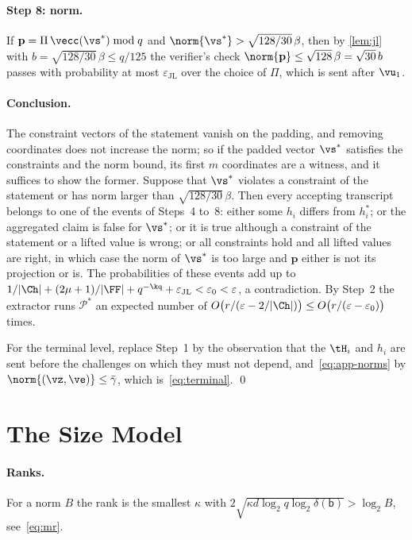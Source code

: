 \paragraph{Step 8: norm.}
If $\mathbf p=\Pi\,\vecc(\vs^*)\bmod q$ and $\norm{\vs^*}>\sqrt{128/30}\,\beta$, then by \cref{lem:jl} with $b=\sqrt{128/30}\,\beta\le q/125$ the verifier's check $\norm{\mathbf p}\le\sqrt{128}\,\beta=\sqrt{30}\,b$ passes with probability at most $\varepsilon_{\mathrm{JL}}$ over the choice of $\Pi$, which is sent after $\vu_1$.

\paragraph{Conclusion.}
The constraint vectors of the statement vanish on the padding, and removing coordinates does not increase the norm; so if the padded vector $\vs^*$ satisfies the constraints and the norm bound, its first $m$ coordinates are a witness, and it suffices to show the former. Suppose that $\vs^*$ violates a constraint of the statement or has norm larger than $\sqrt{128/30}\,\beta$. Then every accepting transcript belongs to one of the events of Steps~4 to~8: either some $h_i$ differs from $h_i^*$; or the aggregated claim is false for $\vs^*$; or it is true although a constraint of the statement or a lifted value is wrong; or all constraints hold and all lifted values are right, in which case the norm of $\vs^*$ is too large and $\mathbf p$ either is not its projection or is. The probabilities of these events add up to $1/\lvert\Ch\rvert+(2\mu+1)/\lvert\FF\rvert+q^{-\kq}+\varepsilon_{\mathrm{JL}}<\varepsilon_0<\varepsilon$, a contradiction. By Step~2 the extractor runs $\mathcal P^*$ an expected number of $O\bigl(r/(\varepsilon-2/\lvert\Ch\rvert)\bigr)\le O\bigl(r/(\varepsilon-\varepsilon_0)\bigr)$ times.

For the terminal level, replace Step~1 by the observation that the $\tH_i$ and $h_i$ are sent before the challenges on which they must not depend, and~\eqref{eq:app-norms} by $\norm{(\vz,\ve)}\le\bar\gamma$, which is~\eqref{eq:terminal}. \qed

\section{The Size Model}\label{app:model}

\paragraph{Ranks.}
For a norm $B$ the rank is the smallest $\kappa$ with $2\sqrt{\kappa d\log_2q\log_2\delta(\mathsf b)}>\log_2B$, see~\eqref{eq:mr}.

